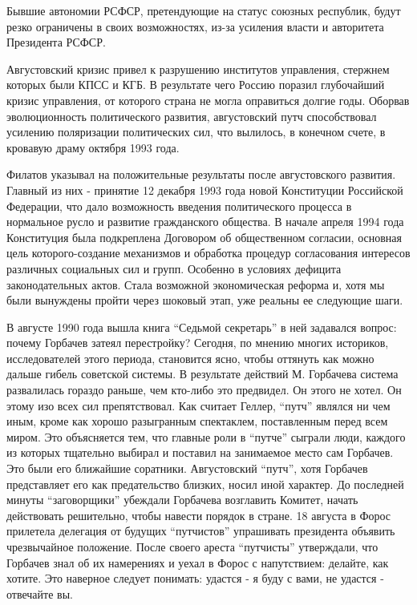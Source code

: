 \documentclass[12pt]{extarticle}
\begin{document}
Бывшие автономии РСФСР, претендующие на статус союзных республик, будут резко ограничены в своих возможностях, из-за усиления власти и авторитета Президента РСФСР.

Августовский кризис привел к разрушению институтов управления, стержнем которых были КПСС и КГБ. В результате чего Россию поразил глубочайший кризис управления, от которого страна не могла оправиться долгие годы. Оборвав эволюционность политического развития, августовский путч способствовал усилению поляризации политических сил, что вылилось, в конечном счете, в кровавую драму октября 1993 года.

Филатов указывал на положительные результаты после августовского развития. Главный из них - принятие 12 декабря 1993 года новой Конституции Российской Федерации, что дало возможность введения политического процесса в нормальное русло и развитие гражданского общества. В начале апреля 1994 года Конституция была подкреплена Договором об общественном согласии, основная цель которого-создание механизмов и обработка процедур согласования интересов различных социальных сил и групп. Особенно в условиях дефицита законодательных актов. Стала возможной экономическая реформа и, хотя мы были вынуждены пройти через шоковый этап, уже реальны ее следующие шаги.

В августе 1990 года вышла книга “Седьмой секретарь”\cite{3} в ней задавался вопрос: почему Горбачев затеял перестройку? Сегодня, по мнению многих историков, исследователей этого периода, становится ясно, чтобы оттянуть как можно дальше гибель советской системы. В результате действий М. Горбачева система развалилась гораздо раньше, чем кто-либо это предвидел. Он этого не хотел. Он этому изо всех сил препятствовал. Как считает Геллер, “путч” являлся ни чем иным, кроме как хорошо разыгранным спектаклем, поставленным перед всем миром. Это объясняется тем, что главные роли в “путче” сыграли люди, каждого из которых тщательно выбирал и поставил на занимаемое место сам Горбачев. Это были его ближайшие соратники. Августовский “путч”, хотя Горбачев представляет его как предательство близких, носил иной характер. До последней минуты “заговорщики” убеждали Горбачева возглавить Комитет, начать действовать решительно, чтобы навести порядок в стране. 18 августа в Форос прилетела делегация от будущих “путчистов” упрашивать президента объявить чрезвычайное положение. После своего ареста “путчисты” утверждали, что Горбачев знал об их намерениях и уехал в Форос с напутствием: делайте, как хотите. Это наверное следует понимать: удастся - я буду с вами, не удастся - отвечайте вы.
\end{document}

